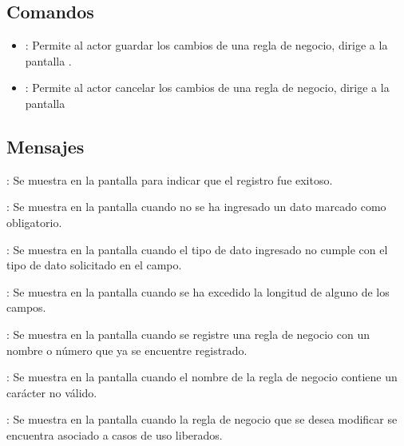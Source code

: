 \subsection{Comandos}
\begin{itemize}
	\item {}: Permite al actor guardar los cambios de una regla de negocio, dirige a la pantalla .
	\item {}: Permite al actor cancelar los cambios de una regla de negocio, dirige a la pantalla 
\end{itemize}

\subsection{Mensajes}

\begin{Citemize}
	\item {}: Se muestra en la pantalla  para indicar que el registro fue exitoso.
	\item {}: Se muestra en la pantalla  cuando no se ha ingresado un dato marcado como obligatorio.
	\item {}: Se muestra en la pantalla  cuando el tipo de dato ingresado no cumple con el tipo de dato solicitado en el campo.
	\item {}: Se muestra en la pantalla  cuando se ha excedido la longitud de alguno de los campos.
	\item {}: Se muestra en la pantalla  cuando se registre una regla de negocio con un nombre o número que ya se encuentre registrado.
	\item {}: Se muestra en la pantalla  cuando el nombre de la regla de negocio contiene un carácter no válido.
	\item {}: Se muestra en la pantalla  cuando la regla de negocio que se desea modificar se encuentra asociado a casos de uso liberados.
\end{Citemize}
